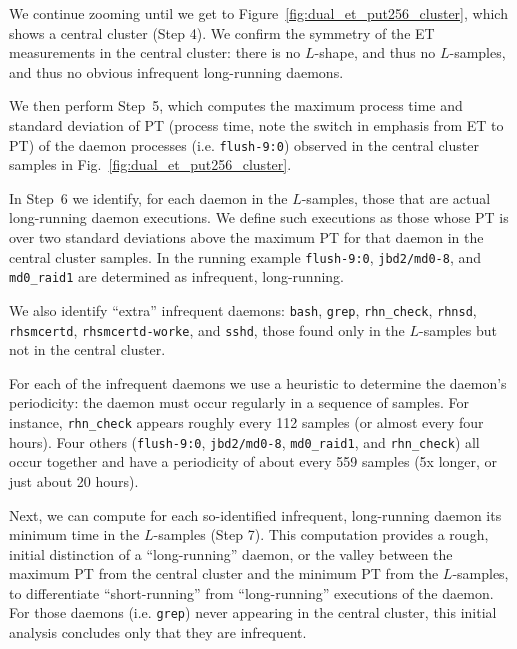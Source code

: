 \documentclass[letter]{ieice}
\begin{document}
We continue zooming until we get to Figure~\ref{fig:dual_et_put256_cluster},
which shows a central cluster (Step 4). 
We confirm the symmetry of the ET measurements in the central cluster: there
is no $L$-shape, and thus no $L$-samples, and thus no obvious infrequent
long-running daemons.

We then perform Step~5, which computes 
the maximum process time and standard deviation 
of PT (process time, note the switch in emphasis from ET to PT) of the daemon processes
(i.e. {\tt flush-9:0}) 
observed in the central cluster samples in Fig.~\ref{fig:dual_et_put256_cluster}. 

In Step~6 we identify, for each daemon in the \hbox{$L$-samples}, 
those that are actual long-running daemon
executions.  We define such executions as those whose PT 
is over two standard deviations above the maximum PT for
that daemon in the central cluster samples. 
In the running example  {\tt flush-9:0}, 
{\tt jbd2/md0-8}, and {\tt md0\_raid1} 
are determined as infrequent, \hbox{long-running}.
{\color{blue}
We also identify ``extra'' infrequent daemons: 
{\tt bash}, {\tt grep}, {\tt rhn\_check}, {\tt rhnsd}, {\tt rhsmcertd}, 
{\tt rhsmcertd-worke}, and {\tt sshd}, those 
found only in the $L$-samples but not in the central cluster. 

For each of the infrequent daemons 
we use a heuristic to determine the daemon's periodicity:
the daemon must occur regularly in a sequence of samples.
For instance, {\tt rhn\_check} appears 
roughly every 112 samples (or almost every four hours). 
Four others ({\tt flush-9:0}, {\tt jbd2/md0-8}, {\tt md0\_raid1}, and {\tt rhn\_check}) 
all occur together and have a periodicity of about every 559 samples 
(5x longer, or just about 20 hours). 
}

Next, we can compute for each so-identified infrequent, long-running daemon its
minimum time in the \hbox{$L$-samples} (Step 7). 
This computation provides a rough, initial distinction of a ``long-running''
daemon, or the valley between the maximum PT from the central cluster 
and the minimum PT from the $L$-samples, to differentiate ``short-running'' 
from ``\hbox{long-running}'' executions of the daemon. 
For those daemons (i.e. {\tt grep}) never appearing in the central cluster,
this initial \hbox{analysis} concludes only that they are infrequent.
\end{document}
